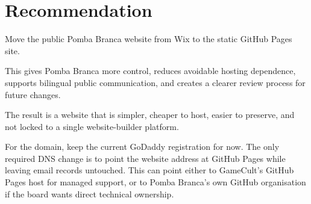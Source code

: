 \documentclass[10pt]{article}
\newcommand{\sectionrule}{\vspace{-0.45em}{\color{PombaBlue}\hrule height 0.8pt}\vspace{0.55em}}
\begin{document}
\section*{Recommendation}
\sectionrule

Move the public Pomba Branca website from Wix to the static GitHub Pages site.

This gives Pomba Branca more control, reduces avoidable hosting dependence, supports bilingual public communication, and creates a clearer review process for future changes.

The result is a website that is simpler, cheaper to host, easier to preserve, and not locked to a single website-builder platform.

For the domain, keep the current GoDaddy registration for now. The only required DNS change is to point the website address at GitHub Pages while leaving email records untouched. This can point either to GameCult's GitHub Pages host for managed support, or to Pomba Branca's own GitHub organisation if the board wants direct technical ownership.
\end{document}
